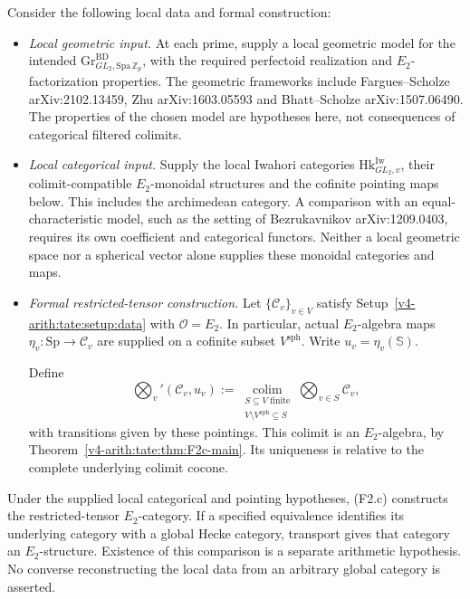 \begin{theorem}
\label{v4-arith:thm:F2-reduction}
Consider the following local data and formal construction:
\begin{itemize}
\item[\textbf{(F2.a)}] \emph{Local geometric input.} At each prime,
supply a local geometric model for the intended
\(\mathrm{Gr}^{\mathrm{BD}}_{GL_2,\mathrm{Spa}\,\mathbb Z_p}\),
with the required perfectoid realization and \(E_2\)-factorization properties.
The geometric frameworks include Fargues--Scholze
arXiv:2102.13459, Zhu arXiv:1603.05593 and
Bhatt--Scholze arXiv:1507.06490. The properties of the chosen
model are hypotheses here, not consequences of categorical
filtered colimits.
\item[\textbf{(F2.b)}] \emph{Local categorical input.} Supply the
local Iwahori categories
\(\mathrm{Hk}^{\mathrm{Iw}}_{GL_2,v}\), their colimit-compatible
\(E_2\)-monoidal structures and the cofinite pointing maps below.
This includes the archimedean category. A comparison with an
equal-characteristic model, such as the setting of Bezrukavnikov
arXiv:1209.0403, requires its own coefficient and categorical
functors. Neither a local geometric space nor a spherical vector
alone supplies these monoidal categories and maps.
\item[\textbf{(F2.c)}] \emph{Formal restricted-tensor construction.}
Let \(\{\mathcal C_v\}_{v\in V}\) satisfy
Setup~\ref{v4-arith:tate:setup:data} with \(\mathcal O=E_2\).
In particular, actual
\(E_2\)-algebra maps \(\eta_v:\mathrm{Sp}\to\mathcal C_v\)
are supplied on a cofinite subset \(V^{\mathrm{sph}}\).
Write \(u_v=\eta_v(\mathbb S)\).

Define
\begin{equation}
 \bigotimes_v'(\mathcal C_v,u_v)
 :=\operatorname*{colim}_{\substack{S\subseteq V\text{ finite}\\V\setminus V^{\mathrm{sph}}\subseteq S}}
       \bigotimes_{v\in S}\mathcal C_v,
\end{equation}
with transitions given by these pointings. This colimit is an
\(E_2\)-algebra, by
Theorem~\ref{v4-arith:tate:thm:F2c-main}. Its uniqueness is
relative to the complete underlying colimit cocone.
\end{itemize}
Under the supplied local categorical and pointing hypotheses,
(F2.c) constructs the restricted-tensor \(E_2\)-category.
If a specified equivalence identifies its underlying category
with a global Hecke category, transport gives that category an
\(E_2\)-structure. Existence of this comparison is a separate
arithmetic hypothesis. No converse reconstructing the local
data from an arbitrary global category is asserted.
\end{theorem}

